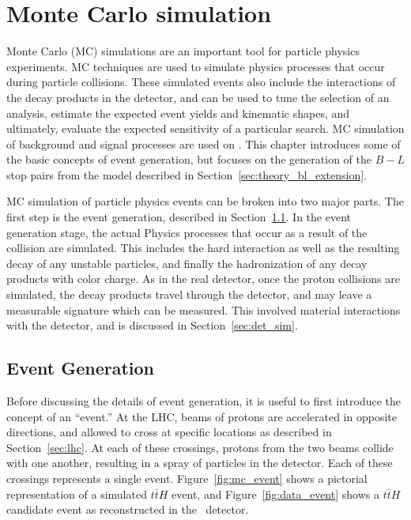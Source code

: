 \chapter[Monte Carlo simulation][Monte Carlo simulation]{Monte Carlo simulation}
\label{ch:mc}

Monte Carlo (MC) simulations are an important tool for particle physics
experiments.
MC techniques are used to simulate physics processes that occur during
particle collisions.
These simulated events also include the interactions of the decay products
in the detector, and can be used to tune the selection of an analysis,
estimate the expected event yields and kinematic shapes, and ultimately,
evaluate the expected sensitivity of a particular search.
MC simulation of background and signal processes are used on \ATLAS.
This chapter introduces some of the basic concepts of event generation, but
focuses on the generation of the $B-L$ stop pairs from the model described in
Section~\ref{sec:theory_bl_extension}.

MC simulation of particle physics events can be broken into two major parts.
The first step is the event generation, described in
Section~\ref{sec:event_gen}.
In the event generation stage, the actual Physics processes that occur as a
result of the collision are simulated.
This includes the hard interaction as well as the resulting decay of any
unstable particles, and finally the hadronization of any decay products with
color charge.
As in the real detector, once the proton collisions are simulated, the decay
products travel through the detector, and may leave a measurable signature
which can be measured.
This involved material interactions with the detector, and is discussed in
Section~\ref{sec:det_sim}.

\FloatBarrier
\section{Event Generation}
\label{sec:event_gen}

Before discussing the details of event generation, it is useful to first
introduce the concept of an ``event.''
At the LHC, beams of protons are accelerated in opposite directions, and
allowed to cross at specific locations as described in Section~\ref{sec:lhc}.
At each of these crossings, protons from the two beams collide with one
another, resulting in a spray of particles in the detector.
Each of these crossings represents a single event.
Figure~\ref{fig:mc_event} shows a pictorial representation of a simulated
$t\bar{t}H$ event, and Figure~\ref{fig:data_event} shows a $t\bar{t}H$
candidate event as reconstructed in the \ATLAS\ detector.

